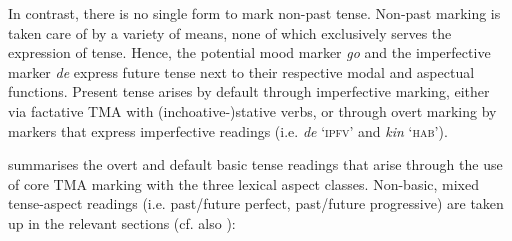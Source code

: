 In contrast, there is no single form to mark non-past tense. Non-past marking is taken care of by a variety of means, none of which exclusively serves the expression of tense. Hence, the potential mood marker \textit{go} and the imperfective marker \textit{de} express future tense next to their respective modal and aspectual functions. Present tense arises by default through imperfective marking, either via factative TMA with (inchoative-)stative verbs, or through overt marking by markers that express imperfective readings (i.e. \textit{de} ‘\textsc{ipfv}’ and \textit{kin} ‘\textsc{hab}’). 


 summarises the overt and default basic tense readings that arise through the use of core TMA marking with the three lexical aspect classes. Non-basic, mixed tense-aspect readings (i.e. past/future perfect, past/future progressive) are taken up in the relevant sections (cf. also ):

